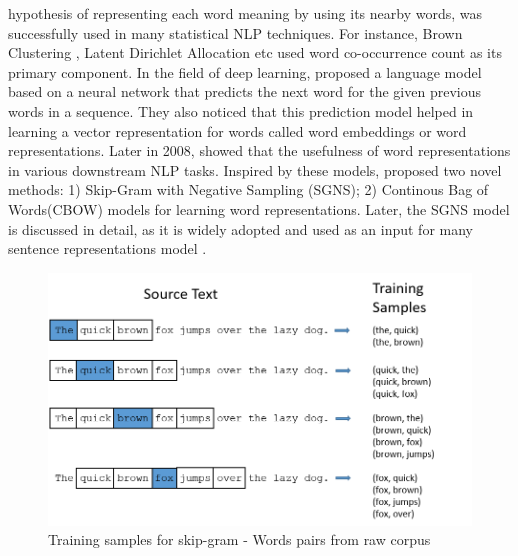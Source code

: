 \documentclass[12pt]{report} %
\begin{document}
\cite{firth1957synopsis} hypothesis of representing each word meaning by using its nearby words, was successfully used in many statistical NLP techniques. For instance, Brown Clustering \citep{brown1992practical} , Latent Dirichlet Allocation \citep{blei2003latent} etc used word co-occurrence count as its primary component. In the field of deep learning, \cite{bengio2003neural} proposed a language model based on a neural network that predicts the next word for the given previous words in a sequence. They also noticed that this prediction model helped in learning a vector representation for words called word embeddings or word representations.
Later in 2008, \cite{collobert2008unified} showed that the usefulness of word representations in various downstream NLP tasks.
Inspired by these models, \cite{mikolov2014word2vec} proposed two novel methods: 1) Skip-Gram with Negative Sampling (SGNS); 2) Continous Bag of Words(CBOW) models for learning word representations. Later,  the SGNS model is discussed in detail, as it is widely adopted and used as an input for many sentence representations model \citep{kiros2015skip}.

\begin{figure}[!tbp]
	\centering
	\includegraphics[scale=0.70]{image/train_samples.png}
	\caption{Training samples for skip-gram - Words pairs from raw corpus}
	\label{train_sam}
\end{figure}
\end{document}
